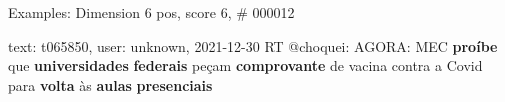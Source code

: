 \begin{frame}{Examples: Dimension 6 pos, score 6, \# 000012}
\footnotesize
\begin{exampleblock}{text: t065850, user: unknown, 2021-12-30}
RT @choquei:  AGORA: MEC \textbf{proíbe} que 
\textbf{universidades} \textbf{federais} peçam \textbf{comprovante} de vacina 
contra a Covid para \textbf{volta} às \textbf{aulas} \textbf{presenciais} 
\end{exampleblock}
\end{frame}
